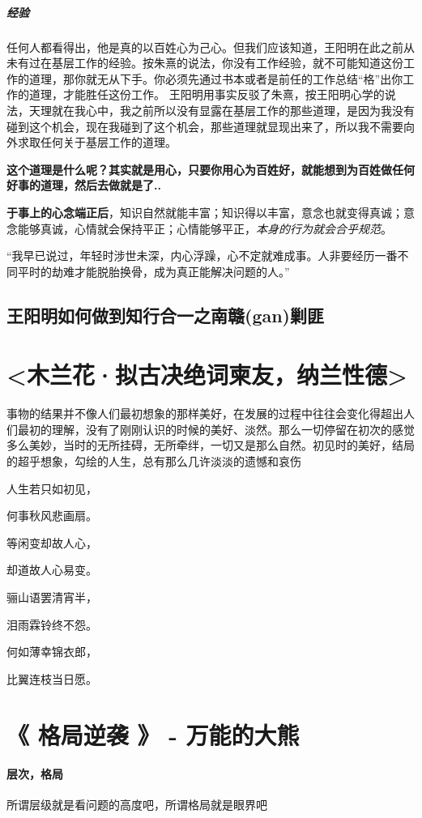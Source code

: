 \documentclass[UTF8,a4paper,8pt]{ctexart}
\begin{document}
 \subparagraph{经验}
 任何人都看得出，他是真的以百姓心为己心。但我们应该知道，王阳明在此之前从未有过在基层工作的经验。按朱熹的说法，你没有工作经验，就不可能知道这份工作的道理，那你就无从下手。你必须先通过书本或者是前任的工作总结“格”出你工作的道理，才能胜任这份工作。 王阳明用事实反驳了朱熹，按王阳明心学的说法，天理就在我心中，我之前所以没有显露在基层工作的那些道理，是因为我没有碰到这个机会，现在我碰到了这个机会，那些道理就显现出来了，所以我不需要向外求取任何关于基层工作的道理。
 
 \textbf{这个道理是什么呢？其实就是用心，只要你用心为百姓好，就能想到为百姓做任何好事的道理，然后去做就是了..}
 
 \textbf{于事上的心念端正后}，知识自然就能丰富；知识得以丰富，意念也就变得真诚；意念能够真诚，心情就会保持平正；心情能够平正，\textit{本身的行为就会合乎规范}。
 
 “我早已说过，年轻时涉世未深，内心浮躁，心不定就难成事。人非要经历一番不同平时的劫难才能脱胎换骨，成为真正能解决问题的人。”
 
 \subsection{王阳明如何做到知行合一之南赣(gan)剿匪}
 \newpage
 \section{<木兰花·拟古决绝词柬友，纳兰性德>}	
 事物的结果并不像人们最初想象的那样美好，在发展的过程中往往会变化得超出人们最初的理解，没有了刚刚认识的时候的美好、淡然。那么一切停留在初次的感觉多么美妙，当时的无所挂碍，无所牵绊，一切又是那么自然。初见时的美好，结局的超乎想象，勾绘的人生，总有那么几许淡淡的遗憾和哀伤
 
 人生若只如初见，
 
 何事秋风悲画扇。
 
 等闲变却故人心，
 
 却道故人心易变。
 
 骊山语罢清宵半，
 
 泪雨霖铃终不怨。
 
 何如薄幸锦衣郎，
 
 比翼连枝当日愿。
 
 \newpage
 \section{《 格局逆袭 》 -  万能的大熊 } 
 \paragraph{层次，格局}
 所谓层级就是看问题的高度吧，所谓格局就是眼界吧
\end{document}
